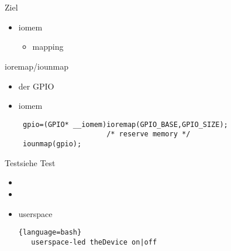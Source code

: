 \section{}
\begin{frame}{Ziel}{}
 \begin{itemize}
  \item iomem
  \begin{itemize}
   \item  mapping
  \end{itemize}
 \end{itemize}
\end{frame}

\begin{frame}[fragile]{ioremap/iounmap}
\begin{itemize}
 \item der  GPIO
 \item iomem
\begin{lstlisting}
 gpio=(GPIO* __iomem)ioremap(GPIO_BASE,GPIO_SIZE); 
                     /* reserve memory */
 iounmap(gpio);
\end{lstlisting}
\end{itemize}
\end{frame}

\begin{frame}[fragile]{Test}{siehe  Test}
 \begin{itemize}
  \item {}
  \item {}
  \item userspace 
  \begin{lstlisting}{language=bash}
   userspace-led theDevice on|off
  \end{lstlisting}
 \end{itemize}
\end{frame}

